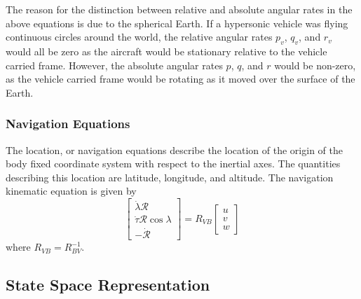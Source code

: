 The reason for the distinction between relative and absolute angular rates in the above equations is due to the spherical Earth.
If a hypersonic vehicle was flying continuous circles around the world, the relative angular rates $p_{v}$, $q_{v}$, and $r_{v}$ would all be zero as the aircraft would be stationary relative to the vehicle carried frame.
However, the absolute angular rates $p$, $q$, and $r$ would be non-zero, as the vehicle carried frame would be rotating as it moved over the surface of the Earth.

\subsubsection{Navigation Equations}

The location, or navigation equations describe the location of the origin of the body fixed coordinate system with respect to the inertial axes.
The quantities describing this location are latitude, longitude, and altitude.
The navigation kinematic equation is given by
\begin{equation}
  \label{eqn.NavigationEqn}
  \begin{bmatrix}
    \dot{\lambda}\mathscr{R} \\
    \dot{\tau}\mathscr{R}\cos{\lambda} \\
    -\dot{\mathscr{R}}
  \end{bmatrix}=R_{VB}
  \begin{bmatrix}
    u \\
    v \\
    w
  \end{bmatrix}
\end{equation}
where $R_{VB}=R_{BV}^{-1}$.

\subsection{State Space Representation}


